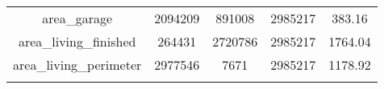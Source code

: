 \documentclass[]{book}
\theoremstyle{definition}
\theoremstyle{definition}
\theoremstyle{definition}
\theoremstyle{remark}
\begin{document}
\begin{longtable}[]{@{}ccccc@{}}
\begin{minipage}[t]{0.35\columnwidth}\centering\strut
area\_garage\strut
\end{minipage} & \begin{minipage}[t]{0.12\columnwidth}\centering\strut
2094209\strut
\end{minipage} & \begin{minipage}[t]{0.13\columnwidth}\centering\strut
891008\strut
\end{minipage} & \begin{minipage}[t]{0.12\columnwidth}\centering\strut
2985217\strut
\end{minipage} & \begin{minipage}[t]{0.12\columnwidth}\centering\strut
383.16\strut
\end{minipage}\tabularnewline
\begin{minipage}[t]{0.35\columnwidth}\centering\strut
area\_living\_finished\strut
\end{minipage} & \begin{minipage}[t]{0.12\columnwidth}\centering\strut
264431\strut
\end{minipage} & \begin{minipage}[t]{0.13\columnwidth}\centering\strut
2720786\strut
\end{minipage} & \begin{minipage}[t]{0.12\columnwidth}\centering\strut
2985217\strut
\end{minipage} & \begin{minipage}[t]{0.12\columnwidth}\centering\strut
1764.04\strut
\end{minipage}\tabularnewline
\begin{minipage}[t]{0.35\columnwidth}\centering\strut
area\_living\_perimeter\strut
\end{minipage} & \begin{minipage}[t]{0.12\columnwidth}\centering\strut
2977546\strut
\end{minipage} & \begin{minipage}[t]{0.13\columnwidth}\centering\strut
7671\strut
\end{minipage} & \begin{minipage}[t]{0.12\columnwidth}\centering\strut
2985217\strut
\end{minipage} & \begin{minipage}[t]{0.12\columnwidth}\centering\strut
1178.92\strut
\end{minipage}\tabularnewline
\begin{minipage}[t]{0.35\columnwidth}\centering\strut

\end{minipage}
\end{longtable}
\end{document}
